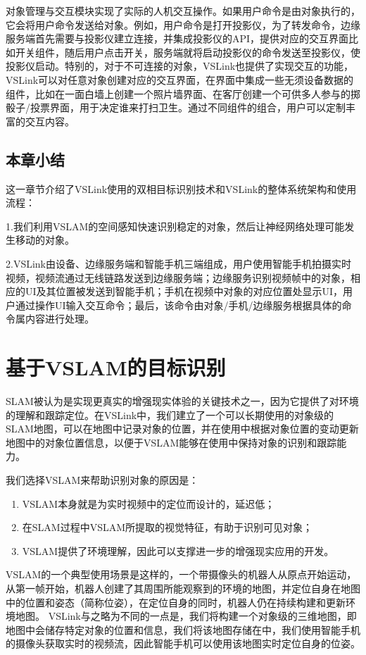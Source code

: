 对象管理与交互模块实现了实际的人机交互操作。如果用户命令是由对象执行的，它会将用户命令发送给对象。例如，用户命令是打开投影仪，为了转发命令，边缘服务端首先需要与投影仪建立连接，并集成投影仪的API，提供对应的交互界面比如开关组件，随后用户点击开关，服务端就将启动投影仪的命令发送至投影仪，使投影仪启动。特别的，对于不可连接的对象，VSLink也提供了实现交互的功能，VSLink可以对任意对象创建对应的交互界面，在界面中集成一些无须设备数据的组件，比如在一面白墙上创建一个照片墙界面、在客厅创建一个可供多人参与的掷骰子/投票界面，用于决定谁来打扫卫生。通过不同组件的组合，用户可以定制丰富的交互内容。

\section{本章小结}
这一章节介绍了VSLink使用的双相目标识别技术和VSLink的整体系统架构和使用流程：

1.我们利用VSLAM的空间感知快速识别稳定的对象，然后让神经网络处理可能发生移动的对象。

2.VSLink由设备、边缘服务端和智能手机三端组成，用户使用智能手机拍摄实时视频，视频流通过无线链路发送到边缘服务端；边缘服务识别视频帧中的对象，相应的UI及其位置被发送到智能手机；手机在视频中对象的对应位置处显示UI，用户通过操作UI输入交互命令；最后，该命令由对象/手机/边缘服务根据具体的命令属内容进行处理。

\chapter{基于VSLAM的目标识别}
\label{chap:vslam}

SLAM被认为是实现更真实的增强现实体验的关键技术之一，因为它提供了对环境的理解和跟踪定位。在VSLink中，我们建立了一个可以长期使用的对象级的SLAM地图，可以在地图中记录对象的位置，并在使用中根据对象位置的变动更新地图中的对象位置信息，以便于VSLAM能够在使用中保持对象的识别和跟踪能力。

我们选择VSLAM来帮助识别对象的原因是：

\begin{enumerate}
	\item VSLAM本身就是为实时视频中的定位而设计的，延迟低；
	\item 在SLAM过程中VSLAM所提取的视觉特征，有助于识别可见对象；
	\item VSLAM提供了环境理解，因此可以支撑进一步的增强现实应用的开发。
\end{enumerate}

VSLAM的一个典型使用场景是这样的，一个带摄像头的机器人从原点开始运动，从第一帧开始，机器人创建了其周围所能观察到的环境的地图，并定位自身在地图中的位置和姿态（简称位姿），在定位自身的同时，机器人仍在持续构建和更新环境地图。
VSLink与之略为不同的一点是，我们将构建一个对象级的三维地图，即地图中会储存特定对象的位置和信息，我们将该地图存储在{\edg}中，我们使用智能手机的摄像头获取实时的视频流，因此智能手机可以使用该地图实时定位自身的位姿。

